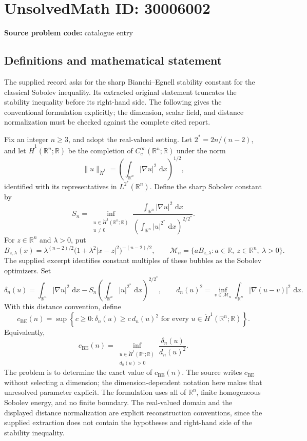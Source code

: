 \documentclass[11pt]{article}
\newcommand{\R}{\mathbb{R}}
\newcommand{\dd}{\,\mathrm{d}}
\begin{document}
\section*{UnsolvedMath ID: 30006002}
\textbf{Source problem code:} catalogue entry
\subsection{Definitions and mathematical statement}
The supplied record asks for the sharp Bianchi--Egnell stability constant for the classical Sobolev inequality. Its extracted original statement truncates the stability inequality before its right-hand side. The following gives the conventional formulation explicitly; the dimension, scalar field, and distance normalization must be checked against the complete cited report.

Fix an integer \(n\geq 3\), and adopt the real-valued setting. Let \(2^*=2n/(n-2)\), and let \(\dot H^1(\R^n;\R)\) be the completion of \(C_c^\infty(\R^n;\R)\) under the norm
\[
\|u\|_{\dot H^1}=\left(\int_{\R^n}|\nabla u|^2\,\dd x\right)^{1/2},
\]
identified with its representatives in \(L^{2^*}(\R^n)\). Define the sharp Sobolev constant by
\[
S_n=\inf_{\substack{u\in\dot H^1(\R^n;\R)\\u\ne0}}
\frac{\displaystyle\int_{\R^n}|\nabla u|^2\,\dd x}
{\displaystyle\left(\int_{\R^n}|u|^{2^*}\,\dd x\right)^{2/2^*}}.
\]
For \(z\in\R^n\) and \(\lambda>0\), put
\[
B_{z,\lambda}(x)=\lambda^{(n-2)/2}\bigl(1+\lambda^2|x-z|^2\bigr)^{-(n-2)/2},
\qquad
\mathcal M_n=\{aB_{z,\lambda}:a\in\R,\ z\in\R^n,\ \lambda>0\}.
\]
The supplied excerpt identifies constant multiples of these bubbles as the Sobolev optimizers. Set
\[
\delta_n(u)=\int_{\R^n}|\nabla u|^2\,\dd x
-S_n\left(\int_{\R^n}|u|^{2^*}\,\dd x\right)^{2/2^*},
\qquad
d_n(u)^2=\inf_{v\in\mathcal M_n}\int_{\R^n}|\nabla(u-v)|^2\,\dd x.
\]
With this distance convention, define
\[
c_{\mathrm{BE}}(n)=\sup\left\{c\geq0:
\delta_n(u)\geq c\,d_n(u)^2
\text{ for every }u\in\dot H^1(\R^n;\R)\right\}.
\]
Equivalently,
\[
c_{\mathrm{BE}}(n)=
\inf_{\substack{u\in\dot H^1(\R^n;\R)\\d_n(u)>0}}
\frac{\delta_n(u)}{d_n(u)^2}.
\]
The problem is to determine the exact value of \(c_{\mathrm{BE}}(n)\). The source writes \(c_{\mathrm{BE}}\) without selecting a dimension; the dimension-dependent notation here makes that unresolved parameter explicit. The formulation uses all of \(\R^n\), finite homogeneous Sobolev energy, and no finite boundary. The real-valued domain and the displayed distance normalization are explicit reconstruction conventions, since the supplied extraction does not contain the hypotheses and right-hand side of the stability inequality.
\end{document}
